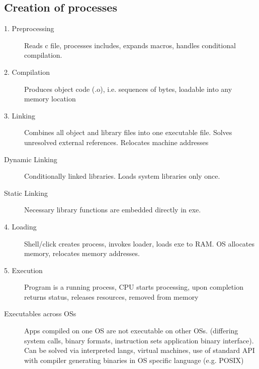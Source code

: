 \subsection{Creation of processes}
\begin{description}
  \item[1. Preprocessing] Reads c file, processes includes, expands macros, handles conditional compilation.
  \item[2. Compilation] Produces object code (.o), i.e. sequences of bytes, loadable into any memory location
  \item[3. Linking] Combines all object and library files into one executable file. Solves unresolved external references. Relocates machine addresses
  \item[Dynamic Linking] Conditionally linked libraries. Loads system libraries only once.
  \item[Static Linking] Necessary library functions are embedded directly in exe.
  \item[4. Loading] Shell/click creates process, invokes loader, loads exe to RAM. OS allocates memory, relocates memory addresses.
  \item[5. Execution] Program is a running process, CPU starts processing, upon completion returns status, releases resources, removed from memory
  
    

  \item[Executables across OSs] Apps compiled on one OS are not executable on other OSs. (differing system calls, binary formats, instruction sets application binary interface). Can be solved via interpreted langs, virtual machines, use of standard API with compiler generating binaries in OS specific language (e.g. POSIX)
  
\end{description}

